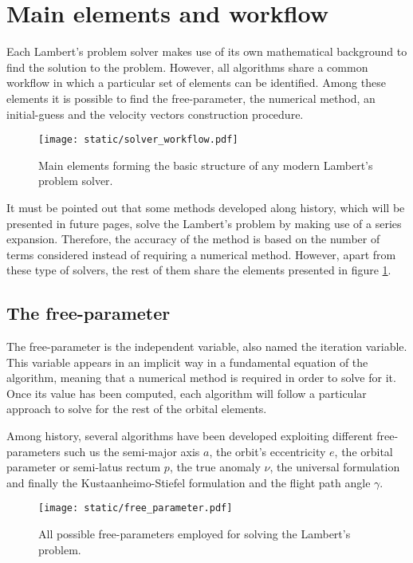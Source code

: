 \section{Main elements and workflow}

Each Lambert's problem solver makes use of its own mathematical background to
find the solution to the problem. However, all algorithms share a common
workflow in which a particular set of elements can be identified. Among these
elements it is possible to find the free-parameter, the numerical method, an
initial-guess and the velocity vectors construction procedure.

\vspace{0.5cm}
\begin{figure}[h]
  \centering
  \texttt{[image: static/solver\_workflow.pdf]}
  \caption{Main elements forming the basic structure of any modern Lambert's
  problem solver.}
   \label{fig:solver_elements}
\end{figure}

It must be pointed out that some methods developed along history, which will be
presented in future pages, solve the Lambert's problem by making use of a series
expansion. Therefore, the accuracy of the method is based on the number of
terms considered instead of requiring a numerical method. However, apart from
these type of solvers, the rest of them share the elements presented in figure
\ref{fig:solver_elements}.

\subsection{The free-parameter}

The free-parameter is the independent variable, also named the iteration
variable. This variable appears in an implicit way in a fundamental equation of
the algorithm, meaning that a numerical method is required in order to solve for
it. Once its value has been computed, each algorithm will follow a particular
approach to solve for the rest of the orbital elements.

Among history, several algorithms have been developed exploiting different
free-parameters such us the semi-major axis $a$, the orbit's eccentricity $e$,
the orbital parameter or semi-latus rectum $p$, the true anomaly $\nu$, the
universal formulation and finally the Kustaanheimo-Stiefel formulation and the
flight path angle $\gamma$.

\vspace{0.5cm}
\begin{figure}[h]
  \centering
  \texttt{[image: static/free\_parameter.pdf]}
  \caption{All possible free-parameters employed for solving the Lambert's problem.}
  \label{fig:free_parameter}
\end{figure}


